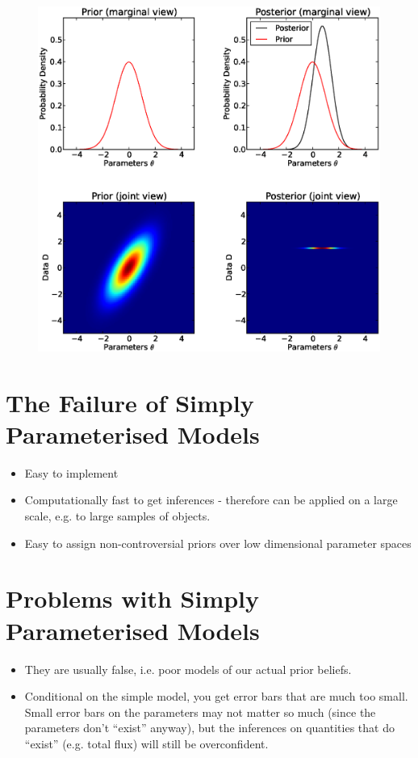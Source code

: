 \documentclass[letterpaper, 11pt]{article}
\begin{document}
\begin{figure}
\begin{center}
\includegraphics[scale=0.5]{joint_marginal.eps}
\end{center}
\end{figure}

\section{The Failure of Simply Parameterised Models}
\begin{itemize}
\item Easy to implement \\
\item Computationally fast to get inferences - therefore can be applied on a large scale, e.g. to large samples of objects. \\
\item Easy to assign non-controversial priors over low dimensional parameter spaces \\
\end{itemize}

\section{Problems with Simply Parameterised Models}
\begin{itemize}
\item They are usually false, i.e. poor models of our actual prior beliefs. \\
\item Conditional on the simple model, you get error bars that are much too small. Small error bars on the parameters may not matter so much (since the parameters don't ``exist'' anyway), but the inferences on quantities that do ``exist'' (e.g. total flux) will still be overconfident. \\
\end{itemize}
\end{document}

